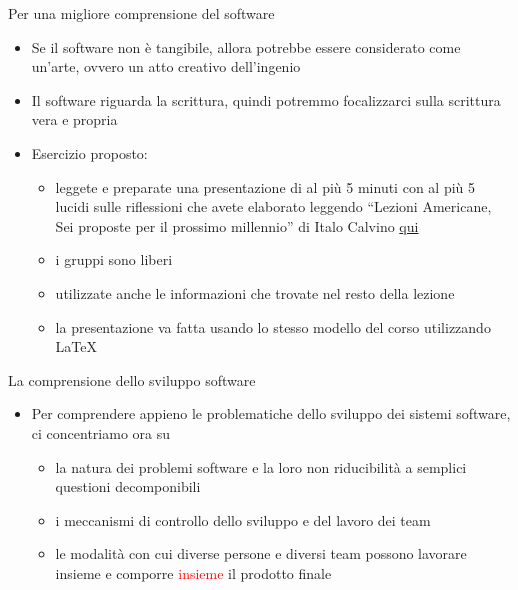 \documentclass{beamer}
\begin{document}
\begin{frame}{\centerline{Per una migliore comprensione del software}}

\begin{itemize}
\item Se il software non \`{e} tangibile, allora potrebbe essere considerato come un'arte, ovvero un atto creativo dell'ingenio
\item Il software riguarda la scrittura, quindi potremmo focalizzarci sulla scrittura vera e propria 
\item Esercizio proposto: 
\begin{itemize}
\item leggete e preparate una presentazione di al pi\`{u} 5 minuti con al pi\`{u} 5 lucidi sulle riflessioni che avete elaborato leggendo ``Lezioni Americane, Sei proposte per il prossimo millennio'' di Italo Calvino \href{https://github.com/GiancarloSucci/UniBo.IDSEPC.A2022/blob/main/P2023.AIBCCSS.IlConcettoDiSoftware/ItaloCalvino.LezioniAmericane.pdf}{qui}
\item i gruppi sono liberi
\item utilizzate anche le informazioni che trovate nel resto della lezione
\item la presentazione va fatta usando lo stesso modello del corso utilizzando \LaTeX
\end{itemize}
\end{itemize}

\end{frame}


\begin{frame}{\centerline{La comprensione dello sviluppo software}}

\begin{itemize}
\item Per comprendere appieno le problematiche dello sviluppo dei sistemi software, ci concentriamo ora su
\begin{itemize}
\item la natura dei problemi software e la loro non riducibilit\`{a} a semplici questioni decomponibili
\item i meccanismi di controllo dello sviluppo e del lavoro dei team
\item le modalit\`{a} con cui diverse persone e diversi team possono lavorare insieme e comporre \textcolor{red}{insieme} il prodotto finale
\end{itemize}
\end{itemize}
\end{frame}
\end{document}
